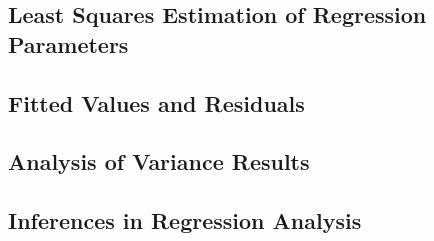 \subsection{Least Squares Estimation of Regression Parameters}

\subsection{Fitted Values and Residuals}

\subsection{Analysis of Variance Results}

\subsection{Inferences in Regression Analysis}

